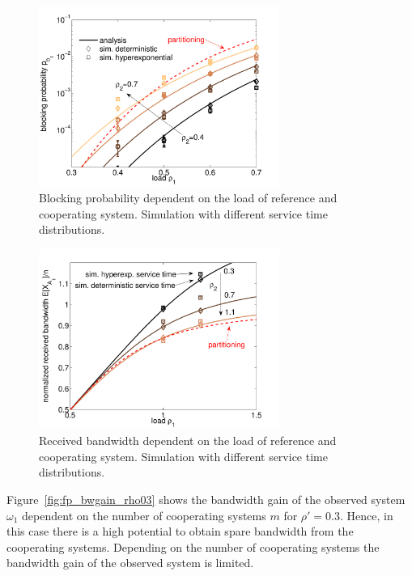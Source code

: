 \begin{figure}[tb]
	\centering
	\includegraphics[width=0.7\textwidth]{aggregation/performance_model/figures/m2_n20_rho2_sim}
 	\caption{Blocking probability dependent on the load of reference and cooperating system. Simulation with different service time distributions.}
 	\label{fig:m2_n20_rho2_sim}
\end{figure}

\begin{figure}[tb]
	\centering
	\includegraphics[width=0.7\textwidth]{aggregation/performance_model/figures/bw_n20_rho2_sim}
 	\caption{Received bandwidth dependent on the load of reference and cooperating system. Simulation with different service time distributions.}
 	\label{fig:bw_n20_rho2_sim}
\end{figure}

Figure~\ref{fig:fp_bwgain_rho03} shows the bandwidth gain of the observed system $\omega_1$ dependent on the number of cooperating systems $m$ for $\rho'=0.3$.
Hence, in this case there is a high potential to obtain spare bandwidth from the cooperating systems.
Depending on the number of cooperating systems the bandwidth gain of the observed system is limited.

